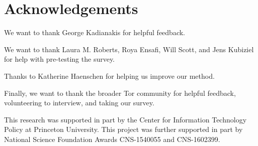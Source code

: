 \section*{Acknowledgements}
We want to thank George Kadianakis for helpful feedback.

We want to thank Laura M. Roberts, Roya Ensafi, Will Scott, and Jens Kubiziel
for help with pre-testing the survey.

Thanks to Katherine Haenschen for helping us improve our method.

Finally, we want to thank the broader Tor community for helpful feedback,
volunteering to interview, and taking our survey.

This research was supported in part by the Center for Information Technology
Policy at Princeton University.  This project was further supported in part by
National Science Foundation Awards CNS-1540055 and CNS-1602399.
